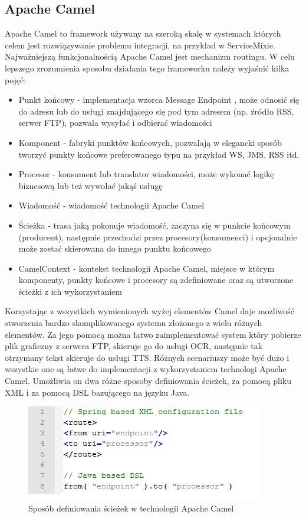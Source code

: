 \subsection{Apache Camel}
Apache Camel \cite{camel2012} \cite{ibsen2010} to framework używany na szeroką skalę w systemach których celem jest rozwiązywanie problemu integracji, na przykład w ServiceMixie. Najważniejszą funkcjonalnością Apache Camel jest mechanizm routingu. W celu lepszego zrozumienia sposobu działania tego frameworku należy wyjaśnić kilka pojęć:
\begin{itemize}
	\item Punkt końcowy - implementacja wzorca Message Endpoint \cite{hohpe2003}, może odnosić się do adresu lub do usługi znajdującego się pod tym adresem (np. źródło RSS, serwer FTP), pozwala wysyłać i odbierać wiadomości  
	\item Komponent - fabryki punktów końcowych, pozwalają w elegancki sposób tworzyć punkty końcowe preferowanego typu na przykład WS, JMS, RSS itd.
	\item Procesor - konsument lub translator wiadomości, może wykonać logikę biznesową lub też wywołać jakąś usługę
	\item Wiadomość - wiadomość technologii Apache Camel
	\item Ścieżka - trasa jaką pokonuje wiadomość, zaczyna się w punkcie końcowym (producent), następnie przechodzi przez procesory(konsumenci) i opcjonalnie może zostać skierowana do innego punktu końcowego
	\item CamelContext - kontekst technologii Apache Camel, miejsce w którym komponenty, punkty końcowe i procesory są zdefiniowane oraz są utworzone ścieżki z ich wykorzystaniem
\end{itemize}  
Korzystając z wszystkich wymienionych wyżej elementów Camel daje możliwość stworzenia bardzo skomplikowanego systemu złożonego z wielu różnych elementów. Za jego pomocą można łatwo zaimplementować system który pobierze plik graficzny z serwera FTP, skieruje go do usługi OCR, następnie tak otrzymany tekst skieruje do usługi TTS. Różnych scenariuszy może być dużo i wszystkie one są łatwe do implementacji z wykorzystaniem technologi Apache Camel. Umożliwia on dwa różne sposoby definiowania ścieżek, za pomocą pliku XML i za pomocą DSL bazującego na języku Java.
\begin{figure}[!h]
	\centering
	\includegraphics[scale=0.95]{camel.png} 
	\caption{Sposób definiowania ścieżek w technologii Apache Camel}
\end{figure}

